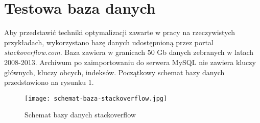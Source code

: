 \section{Testowa baza danych}

Aby przedstawić techniki optymalizacji zawarte w pracy na rzeczywistych przykładach, wykorzystano bazę danych udostępnioną przez portal \textit{stackoverflow.com}. Baza zawiera w granicach 50 Gb danych zebranych w latach 2008-2013. Archiwum po zaimportowaniu do serwera MySQL nie zawiera kluczy głównych, kluczy obcych, indeksów.
Początkowy schemat bazy danych przedstawiono na rysunku 1.
\begin{figure}[h!]
    \texttt{[image: schemat-baza-stackoverflow.jpg]} 
    \caption{Schemat bazy danych stackoverflow}
\end{figure}
